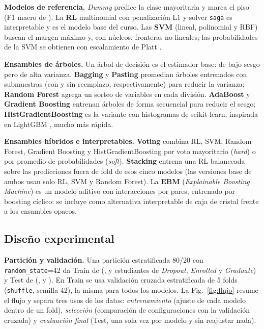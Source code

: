\documentclass[conference]{IEEEtran}
\newcommand{\cD}{\emph{Dropout}}
\newcommand{\cE}{\emph{Enrolled}}
\newcommand{\cG}{\emph{Graduate}}
\newcommand{\Fm}{F1 macro}
\begin{document}
\textbf{Modelos de referencia.} \emph{Dummy} predice la clase mayoritaria y marca el piso (\Fm{} de \teFDUM{}). La \textbf{RL} multinomial con penalización L1 \cite{tibshirani1996} y solver \texttt{saga} \cite{defazio2014} es interpretable y es el modelo base del curso. Las \textbf{SVM} (lineal, polinomial y RBF) \cite{cortes1995} buscan el margen máximo y, con núcleos, fronteras no lineales; las probabilidades de la SVM se obtienen con escalamiento de Platt \cite{platt1999}.

\textbf{Ensambles de árboles.} Un árbol de decisión es el estimador base: de bajo sesgo pero de alta varianza. \textbf{Bagging} \cite{breiman1996} y \textbf{Pasting} \cite{breiman1999} promedian árboles entrenados con submuestras (con y sin reemplazo, respectivamente) para reducir la varianza; \textbf{Random Forest} \cite{breiman2001} agrega un sorteo de variables en cada división. \textbf{AdaBoost} \cite{freund1997} y \textbf{Gradient Boosting} \cite{friedman2001} entrenan árboles de forma secuencial para reducir el sesgo; \textbf{HistGradientBoosting} es la variante con histogramas de scikit-learn, inspirada en LightGBM \cite{ke2017}, mucho más rápida.

\textbf{Ensambles híbridos e interpretables.} \textbf{Voting} combina RL, SVM, Random Forest, Gradient Boosting y HistGradientBoosting por voto mayoritario (\emph{hard}) o por promedio de probabilidades (\emph{soft}). \textbf{Stacking} \cite{wolpert1992} entrena una RL balanceada sobre las predicciones fuera de fold de esos cinco modelos (las versiones base de ambos usan solo RL, SVM y Random Forest). La \textbf{EBM} (\emph{Explainable Boosting Machine}) \cite{lou2013,nori2019} es un modelo aditivo con interacciones por pares, entrenado por boosting cíclico: se incluye como alternativa interpretable de caja de cristal frente a los ensambles opacos.

\subsection{Diseño experimental}\label{sec:disenio}
\textbf{Partición y validación.} Una partición estratificada 80/20 con \texttt{random\_state}=42 da Train de \Ntr{} (\ntrD{}, \ntrE{} y \ntrG{} estudiantes de \cD, \cE{} y \cG) y Test de \Nte{} (\nteD{}, \nteE{} y \nteG{}). En Train se usa validación cruzada estratificada de 5 folds (\texttt{shuffle}, semilla 42), la misma para todos los modelos. La Fig.~\ref{fig:flujo} resume el flujo y separa tres usos de los datos: \emph{entrenamiento} (ajuste de cada modelo dentro de un fold), \emph{selección} (comparación de configuraciones con la validación cruzada) y \emph{evaluación final} (Test, una sola vez por modelo y sin reajustar nada).
\end{document}
